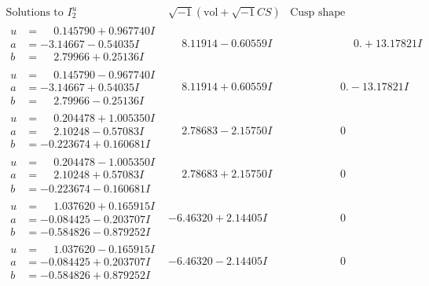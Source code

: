 \documentclass[1p]{elsarticle_modified}
\theoremstyle{definition}
\newcommand{\I}{\sqrt{-1}}
\begin{document}
$$\begin{array}{c|c|c}  
\text{Solutions to }I^u_{2}& \I (\text{vol} + \sqrt{-1}CS) & \text{Cusp shape}\\
 \hline 
\begin{aligned}
u &= \phantom{-}0.145790 + 0.967740 I \\
a &= -3.14667 - 0.54035 I \\
b &= \phantom{-}2.79966 + 0.25136 I\end{aligned}
 & \phantom{-}8.11914 - 0.60559 I & \phantom{-0.000000 -}0. + 13.17821 I \\ \hline\begin{aligned}
u &= \phantom{-}0.145790 - 0.967740 I \\
a &= -3.14667 + 0.54035 I \\
b &= \phantom{-}2.79966 - 0.25136 I\end{aligned}
 & \phantom{-}8.11914 + 0.60559 I & \phantom{-0.000000 } 0. - 13.17821 I \\ \hline\begin{aligned}
u &= \phantom{-}0.204478 + 1.005350 I \\
a &= \phantom{-}2.10248 - 0.57083 I \\
b &= -0.223674 + 0.160681 I\end{aligned}
 & \phantom{-}2.78683 - 2.15750 I & \phantom{-0.000000 } 0 \\ \hline\begin{aligned}
u &= \phantom{-}0.204478 - 1.005350 I \\
a &= \phantom{-}2.10248 + 0.57083 I \\
b &= -0.223674 - 0.160681 I\end{aligned}
 & \phantom{-}2.78683 + 2.15750 I & \phantom{-0.000000 } 0 \\ \hline\begin{aligned}
u &= \phantom{-}1.037620 + 0.165915 I \\
a &= -0.084425 - 0.203707 I \\
b &= -0.584826 - 0.879252 I\end{aligned}
 & -6.46320 + 2.14405 I & \phantom{-0.000000 } 0 \\ \hline\begin{aligned}
u &= \phantom{-}1.037620 - 0.165915 I \\
a &= -0.084425 + 0.203707 I \\
b &= -0.584826 + 0.879252 I\end{aligned}
 & -6.46320 - 2.14405 I & \phantom{-0.000000 } 0 \\ \hline\begin{aligned}

\end{aligned}
\end{array}$$
\end{document}
